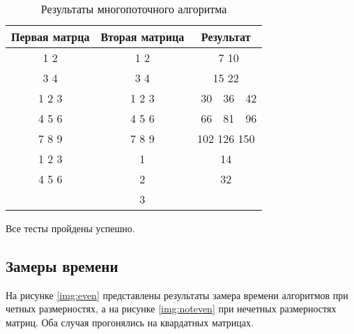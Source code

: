 \begin{table}[H]
    \caption{Результаты многопоточного алгоритма}
    \label{table:test-res-th}
    \centering
    \begin{tabular}{|c|c|c|}
        \hline
        Первая матрца & Вторая матрица & Результат \\
        \hline
        1 2 & 1 2 & \ 7 10 \\
        3 4 & 3 4 & 15 22 \\
        \hline
        1 2 3 & 1 2 3 & \ 30\ \ 36\ \ 42 \\
        4 5 6 & 4 5 6 & \ 66\ \ 81\ \ 96 \\
        7 8 9 & 7 8 9 & 102 126 150 \\
        \hline
        1 2 3 & 1 & 14 \\
        4 5 6 & 2 & 32 \\
              & 3 & \\
        \hline
    \end{tabular}
\end{table}  

Все тесты пройдены успешно.

\subsection{Замеры времени}

На рисунке \ref{img:even} представлены результаты замера времени алгоритмов при
четных размерностях, а на рисунке \ref{img:noteven} при нечетных размерностях матриц.
Оба случая прогонялись на квардатных матрицах.

